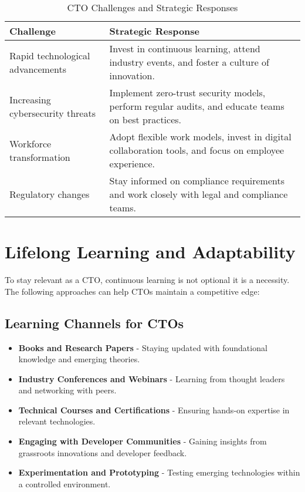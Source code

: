 \begin{table}[ht]
    \centering
    \begin{tabular}{|p{5cm}|p{10cm}|}
        \hline
        \textbf{Challenge}               & \textbf{Strategic Response}                                                                          \\
        \hline
        Rapid technological advancements & Invest in continuous learning, attend industry events, and foster a culture of innovation.           \\
        \hline
        Increasing cybersecurity threats & Implement zero-trust security models, perform regular audits, and educate teams on best practices.   \\
        \hline
        Workforce transformation         & Adopt flexible work models, invest in digital collaboration tools, and focus on employee experience. \\
        \hline
        Regulatory changes               & Stay informed on compliance requirements and work closely with legal and compliance teams.           \\
        \hline
    \end{tabular}
    \caption{CTO Challenges and Strategic Responses}
\end{table}

\section{Lifelong Learning and Adaptability}

To stay relevant as a CTO, continuous learning is not optional \textemdash{} it is a necessity. The following approaches can help CTOs maintain a competitive edge:

\subsection{Learning Channels for CTOs}

\begin{itemize}
    \item \textbf{Books and Research Papers} - Staying updated with foundational knowledge and emerging theories.
    \item \textbf{Industry Conferences and Webinars} - Learning from thought leaders and networking with peers.
    \item \textbf{Technical Courses and Certifications} - Ensuring hands-on expertise in relevant technologies.
    \item \textbf{Engaging with Developer Communities} - Gaining insights from grassroots innovations and developer feedback.
    \item \textbf{Experimentation and Prototyping} - Testing emerging technologies within a controlled environment.
\end{itemize}

